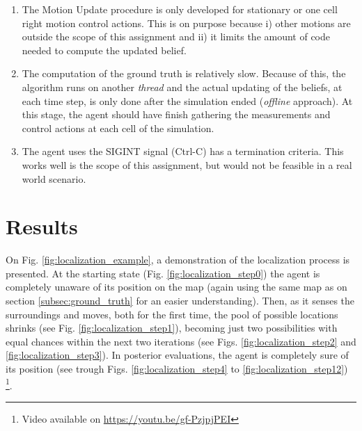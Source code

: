 \documentclass[runningheads]{llncs}
\begin{document}
\begin{enumerate}
    \item The Motion Update procedure is only developed for stationary or one cell right motion control actions. This is on purpose because i) other motions are outside the scope of this assignment and ii) it limits the amount of code needed to compute the updated belief.
    \item The computation of the ground truth is relatively slow. Because of this, the algorithm runs on another \emph{thread} and the actual updating of the beliefs, at each time step, is only done after the simulation ended (\emph{offline} approach). At this stage, the agent should have finish gathering the measurements and control actions at each cell of the simulation.
    \item The agent uses the SIGINT signal (Ctrl-C) has a termination criteria. This works well is the scope of this assignment, but would not be feasible in a real world scenario.
\end{enumerate}

\section{Results}
\label{sec:results}

On Fig. \ref{fig:localization_example}, a demonstration of the localization process is presented. At the starting state (Fig. \ref{fig:localization_step0}) the agent is completely unaware of its position on the map (again using the same map as on section \ref{subsec:ground_truth} for an easier understanding). Then, as it senses the surroundings and moves, both for the first time, the pool of possible locations shrinks (see Fig. \ref{fig:localization_step1}), becoming just two possibilities with equal chances within the next two iterations (see Figs. \ref{fig:localization_step2} and \ref{fig:localization_step3}). In posterior evaluations, the agent is completely sure of its position (see trough Figs. \ref{fig:localization_step4} to \ref{fig:localization_step12}) \footnote{Video available on \url{https://youtu.be/gf-PzjpjPEI}}.
\end{document}
